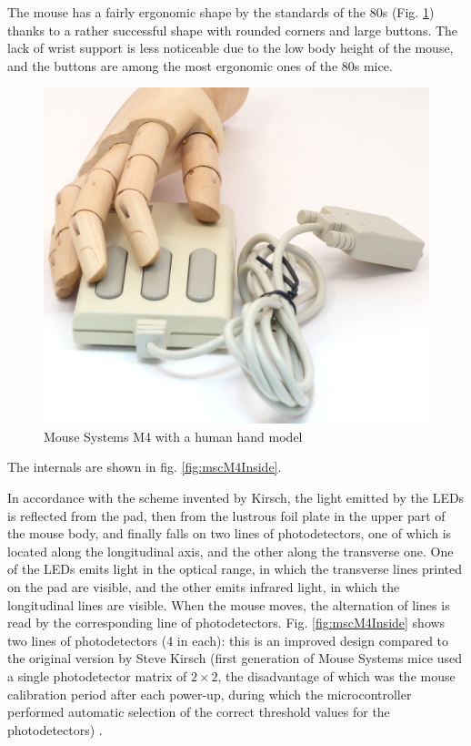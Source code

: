\documentclass[11pt, a4paper]{article}
\begin{document}
The mouse has a fairly ergonomic shape by the standards of the 80s (Fig. \ref{fig:mscM4Hand}) thanks to a rather successful shape with rounded corners and large buttons. The lack of wrist support is less noticeable due to the low body height of the mouse, and the buttons are among the most ergonomic ones of the 80s mice.

\begin{figure}[h]
    \centering
    \includegraphics[scale=0.35]{1988_mouse_systems_m4/hand_30.jpg}
    \caption{Mouse Systems M4 with a human hand model}
    \label{fig:mscM4Hand}
\end{figure}

The internals are shown in fig. \ref{fig:mscM4Inside}.

In accordance with the scheme invented by Kirsch, the light emitted by the LEDs is reflected from the pad, then from the lustrous foil plate in the upper part of the mouse body, and finally falls on two lines of photodetectors, one of which is located along the longitudinal axis, and the other along the transverse one. One of the LEDs emits light in the optical range, in which the transverse lines printed on the pad are visible, and the other emits infrared light, in which the longitudinal lines are visible. When the mouse moves, the alternation of lines is read by the corresponding line of photodetectors. Fig. \ref{fig:mscM4Inside} shows two lines of photodetectors (4 in each): this is an improved design compared to the original version by Steve Kirsch (first generation of Mouse Systems mice used a single photodetector matrix of $2 \times 2$, the disadvantage of which was the mouse calibration period after each power-up, during which the microcontroller performed automatic selection of the correct threshold values for the photodetectors) \cite{bio}.
\end{document}
